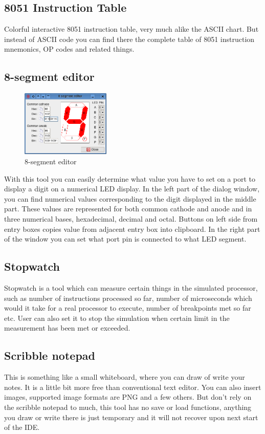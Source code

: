 \documentclass[a4paper,twoside,12pt]{book}
\begin{document}
		\subsection{8051 Instruction Table}
			Colorful interactive 8051 instruction table, very much alike the ASCII chart. But instead of ASCII code you can find there the complete table of 8051 instruction mnemonics, OP codes and related things.

		\subsection{8-segment editor}
			\begin{figure}
				\centering{}
				\includegraphics[width=120pt]{img/020.png}
				\caption{8-segment editor}
			\end{figure}
			With this tool you can easily determine what value you have to set on a port to display a digit on a numerical LED display. In the left part of the dialog window, you can find numerical values corresponding to the digit displayed in the middle part. These values are represented for both common cathode and anode and in three numerical bases, hexadecimal, decimal and octal. Buttons on left side from entry boxes copies value from adjacent entry box into clipboard. In the right part of the window you can set what port pin is connected to what LED segment.

		\subsection{Stopwatch}
			Stopwatch is a tool which can measure certain things in the simulated processor, such as number of instructions processed so far, number of microseconds which would it take for a real processor to execute, number of breakpoints met so far etc. User can also set it to stop the simulation when certain limit in the measurement has been met or exceeded.

		\subsection{Scribble notepad}
			This is something like a small whiteboard, where you can draw of write your notes. It is a little bit more free than conventional text editor. You can also insert images, supported image formats are PNG and a few others. But don't rely on the scribble notepad to much, this tool has no save or load functions, anything you draw or write there is just temporary and it will not recover upon next start of the IDE.
\end{document}

